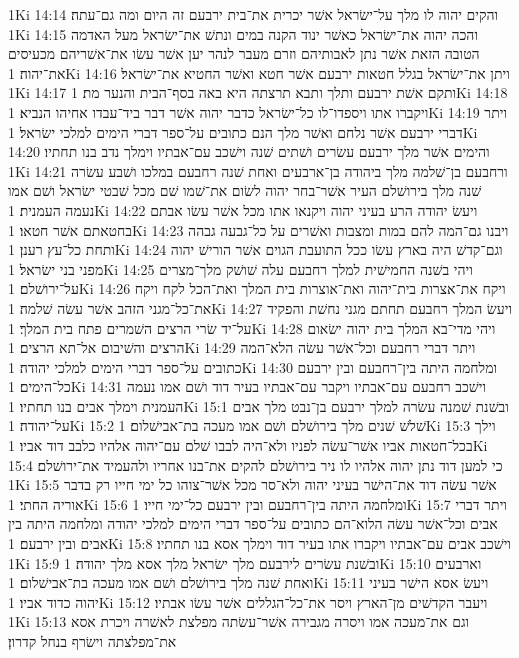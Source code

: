 1Ki 14:14  והקים יהוה לו מלך על־ישׂראל אשׁר יכרית את־בית ירבעם זה היום ומה גם־עתה׃
1Ki 14:15  והכה יהוה את־ישׂראל כאשׁר ינוד הקנה במים ונתשׁ את־ישׂראל מעל האדמה הטובה הזאת אשׁר נתן לאבותיהם וזרם מעבר לנהר יען אשׁר עשׂו את־אשׁריהם מכעיסים את־יהוה׃
1Ki 14:16  ויתן את־ישׂראל בגלל חטאות ירבעם אשׁר חטא ואשׁר החטיא את־ישׂראל׃
1Ki 14:17  ותקם אשׁת ירבעם ותלך ותבא תרצתה היא באה בסף־הבית והנער מת׃
1Ki 14:18  ויקברו אתו ויספדו־לו כל־ישׂראל כדבר יהוה אשׁר דבר ביד־עבדו אחיהו הנביא׃
1Ki 14:19  ויתר דברי ירבעם אשׁר נלחם ואשׁר מלך הנם כתובים על־ספר דברי הימים למלכי ישׂראל׃
1Ki 14:20  והימים אשׁר מלך ירבעם עשׂרים ושׁתים שׁנה וישׁכב עם־אבתיו וימלך נדב בנו תחתיו׃
1Ki 14:21  ורחבעם בן־שׁלמה מלך ביהודה בן־ארבעים ואחת שׁנה רחבעם במלכו ושׁבע עשׂרה שׁנה מלך בירושׁלם העיר אשׁר־בחר יהוה לשׂום את־שׁמו שׁם מכל שׁבטי ישׂראל ושׁם אמו נעמה העמנית׃
1Ki 14:22  ויעשׂ יהודה הרע בעיני יהוה ויקנאו אתו מכל אשׁר עשׂו אבתם בחטאתם אשׁר חטאו׃
1Ki 14:23  ויבנו גם־המה להם במות ומצבות ואשׁרים על כל־גבעה גבהה ותחת כל־עץ רענן׃
1Ki 14:24  וגם־קדשׁ היה בארץ עשׂו ככל התועבת הגוים אשׁר הורישׁ יהוה מפני בני ישׂראל׃
1Ki 14:25  ויהי בשׁנה החמישׁית למלך רחבעם עלה שׁושׁק מלך־מצרים על־ירושׁלם׃
1Ki 14:26  ויקח את־אצרות בית־יהוה ואת־אוצרות בית המלך ואת־הכל לקח ויקח את־כל־מגני הזהב אשׁר עשׂה שׁלמה׃
1Ki 14:27  ויעשׂ המלך רחבעם תחתם מגני נחשׁת והפקיד על־יד שׂרי הרצים השׁמרים פתח בית המלך׃
1Ki 14:28  ויהי מדי־בא המלך בית יהוה ישׂאום הרצים והשׁיבום אל־תא הרצים׃
1Ki 14:29  ויתר דברי רחבעם וכל־אשׁר עשׂה הלא־המה כתובים על־ספר דברי הימים למלכי יהודה׃
1Ki 14:30  ומלחמה היתה בין־רחבעם ובין ירבעם כל־הימים׃
1Ki 14:31  וישׁכב רחבעם עם־אבתיו ויקבר עם־אבתיו בעיר דוד ושׁם אמו נעמה העמנית וימלך אבים בנו תחתיו׃
1Ki 15:1  ובשׁנת שׁמנה עשׂרה למלך ירבעם בן־נבט מלך אבים על־יהודה׃
1Ki 15:2  שׁלשׁ שׁנים מלך בירושׁלם ושׁם אמו מעכה בת־אבישׁלום׃
1Ki 15:3  וילך בכל־חטאות אביו אשׁר־עשׂה לפניו ולא־היה לבבו שׁלם עם־יהוה אלהיו כלבב דוד אביו׃
1Ki 15:4  כי למען דוד נתן יהוה אלהיו לו ניר בירושׁלם להקים את־בנו אחריו ולהעמיד את־ירושׁלם׃
1Ki 15:5  אשׁר עשׂה דוד את־הישׁר בעיני יהוה ולא־סר מכל אשׁר־צוהו כל ימי חייו רק בדבר אוריה החתי׃
1Ki 15:6  ומלחמה היתה בין־רחבעם ובין ירבעם כל־ימי חייו׃
1Ki 15:7  ויתר דברי אבים וכל־אשׁר עשׂה הלוא־הם כתובים על־ספר דברי הימים למלכי יהודה ומלחמה היתה בין אבים ובין ירבעם׃
1Ki 15:8  וישׁכב אבים עם־אבתיו ויקברו אתו בעיר דוד וימלך אסא בנו תחתיו׃
1Ki 15:9  ובשׁנת עשׂרים לירבעם מלך ישׂראל מלך אסא מלך יהודה׃
1Ki 15:10  וארבעים ואחת שׁנה מלך בירושׁלם ושׁם אמו מעכה בת־אבישׁלום׃
1Ki 15:11  ויעשׂ אסא הישׁר בעיני יהוה כדוד אביו׃
1Ki 15:12  ויעבר הקדשׁים מן־הארץ ויסר את־כל־הגללים אשׁר עשׂו אבתיו׃
1Ki 15:13  וגם את־מעכה אמו ויסרה מגבירה אשׁר־עשׂתה מפלצת לאשׁרה ויכרת אסא את־מפלצתה וישׂרף בנחל קדרון׃
